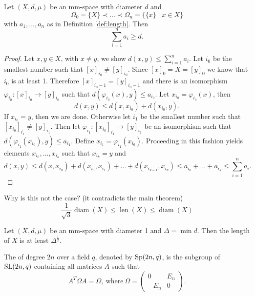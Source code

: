 \begin{lemma}
Let $(X,d,\mu)$ be an mm-space with diameter $d$ and 
\[\Omega_0=\{X\}\prec\dots\prec\Omega_n=\{\{x\}\mid x\in X\}\]
with $a_1,\dots,a_n$ as in Definition \ref{def:length}. Then 
\[\sum_{i=1}^{n}a_i\geq d.\]
\end{lemma}
\begin{proof}
Let $x,y\in X$, with $x\neq y$, we show $d(x,y)\leq\sum_{i=1}^{n}a_i$. Let $i_0$ be the smallest number such that $[x]_{i_0}\neq [y]_{i_0}$. Since $[x]_0=X=[y]_0$ we know that $i_0$ is at least 1. Therefore $[x]_{i_0-1}=[y]_{i_0-1}$ and there is an isomorphism $\varphi_{i_0}\colon[x]_{i_0}\to[y]_{i_0}$ such that $d(\varphi_{i_0}(x),y)\leq a_{i_0}$. Let $x_{i_0}=\varphi_{i_0}(x)$, then 
\[d(x,y)\leq d(x,x_{i_0})+d(x_{i_0},y).\]
If $x_{i_0}=y$, then we are done. Otherwise let $i_1$ be the smallest number such that $[x_{i_0}]_{i_1}\neq [y]_{i_1}$. Then let $\varphi_{i_1}\colon[x_{i_0}]_{i_1}\to[y]_{i_1}$ be an isomorphism such that $d(\varphi_{i_1}(x_{i_0}),y)\leq a_{i_1}$. Define $x_{i_1}=\varphi_{i_1}(x_{i_0})$. Proceeding in this fashion yields elements $x_{i_0},\dots,x_{i_k}$ such that $x_{i_k}=y$ and
\[d(x,y)\leq d(x,x_{i_0})+d(x_{i_0},x_{i_1})+\dots+d(x_{i_{k-1}},x_{i_k})\leq a_{i_0}+\dots +a_{i_k}\leq\sum_{i=1}^{n}a_i.\] 
\end{proof}


\begin{lemma}Why is this not the case? (it contradicts the main theorem)
\[\frac{1}{\sqrt{3}}\operatorname{diam}(X)\leq\operatorname{len}(X)\leq \operatorname{diam}(X)\]
\end{lemma}

\begin{lemma}
Let $(X,d,\mu)$ be an mm-space with diameter 1 and $\Delta=\min d$. Then the length of $X$ is at least $\Delta^{\frac{1}{2}}$.
\end{lemma}

\begin{definition}
The  of degree $2n$ over a field $q$, denoted by $\operatorname{Sp}(2n,q)$, is the subgroup of $\operatorname{SL}(2n,q)$ containing all matrices $A$ such that
\[A^T\Omega A=\Omega,\ \text{where}\ \Omega=\left(\begin{array}{cc}
0&E_n\\
-E_n&0
\end{array}\right).\]
\end{definition}


